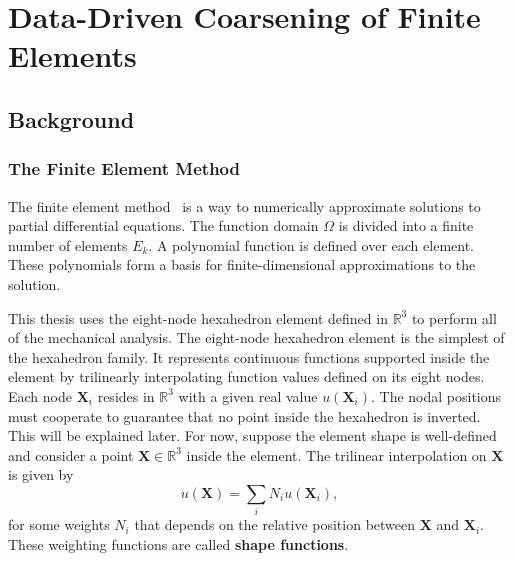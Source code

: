 \chapter{Data-Driven Coarsening of Finite Elements}
\label{ch2:ddfem}
\section{Background}
\subsection{The Finite Element Method}
The finite element method~\citep{ciarlet2002finite} is a way to numerically approximate solutions to partial differential equations.
The function domain $\Omega$ is divided into a finite number of elements $E_k$.
A polynomial function is defined over each element.
These polynomials form a basis for finite-dimensional approximations to the solution.

This thesis uses the eight-node hexahedron element defined in $\mathbb{R}^3$
to perform all of the mechanical analysis.
The eight-node hexahedron element is the simplest of the hexahedron family.
It represents continuous functions supported inside the element by trilinearly interpolating function values defined on its eight nodes.
Each node $\mathbf{X}_i$ resides in $\mathbb{R}^3$ with a given real value $u(\mathbf{X}_i)$.
The nodal positions must cooperate to guarantee that no point inside the hexahedron is inverted.
This will be explained later.
For now, suppose the element shape is well-defined and 
consider a point $\mathbf{X}\in\mathbb{R}^3$ inside the element.
The trilinear interpolation on $\mathbf{X}$ is given by
\[
u(\mathbf{X})=\sum_i N_iu(\mathbf{X}_i),
\]
for some weights $N_i$ that depends on the relative position between $\mathbf{X}$ 
and $\mathbf{X}_i$. These weighting functions are called \textbf{shape functions}.

